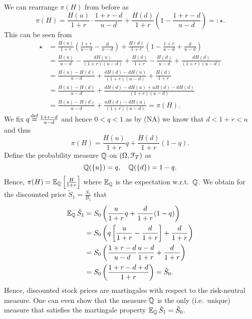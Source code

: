 \documentclass[12pt]{amsart}
\begin{document}
\begin{remark}
    We can rearrange \(\pi(H)\) from before as \[
        \pi(H) = \frac{H(u)}{1+r} \cdot \frac{1+r-d}{u-d} + \frac{H(d)}{1+r} \left(1-\frac{1+r-d}{u-d}\right) =: \star.
    \]
    This can be seen from \begin{align*}
        \star
        &= \frac{H(u)}{1+r}\left(\frac{1+r}{u-d}-\frac{d}{u-d}\right) + \frac{H(d)}{1+r}\left(1-\frac{1+r}{u-d}+\frac{d}{u-d}\right)\\
        &= \frac{H(u)}{u-d} - \frac{dH(u)}{(1+r)(u-d)} + \frac{H(d)}{1+r} - \frac{H(d)}{u-d} + \frac{d H(d)}{(1+r)(u-d)}\\
        &= \frac{H(u)-H(d)}{u-d} + \frac{dH(d)-dH(u)}{(1+r)(u-d)}+\frac{H(d)}{1+r}\\
        &= \frac{H(u)-H(d)}{u-d} + \frac{dH(d)-dH(u)+uH(d)-dH(d)}{(1+r)(u-d)}\\
        &= \frac{H(u)-H(d)}{u-d} + \frac{uH(d)-dH(u)}{(1+r)(u-d)} = \pi(H).
    \end{align*}
    We fix \(q \operatorname*{\stackrel{\operatorname{def}}{=}} \frac{1+r-d}{u-d}\) and hence \(0 < q < 1\) as by (NA) we know that \(d<1+r<u\) and thus \[
        \pi(H) = \frac{H(u)}{1+r}q+\frac{H(d)}{1+r}(1-q).
    \]
    Define the probability measure \(\mathbb{Q}\) on \((\Omega, \mathcal{F}_T)\) as \[
        \mathbb{Q}(\left\{ u \right\}) = q, \quad \mathbb{Q}(\left\{ d \right\})=1-q.
    \]
    Hence, \(\pi(H) = \operatorname{\mathbb{E}}_{\mathbb{Q}} \left[ \frac{H}{1+r} \right]\) where \(\operatorname{\mathbb{E}}_{\mathbb{Q}}\) is the expectation w.r.t.\ \(\mathbb{Q}\).
    We obtain for the discounted price \(\tilde{S}_1 = \frac{S_1}{B_1}\) that
    \begin{align*}
        \operatorname{\mathbb{E}}_{\mathbb{Q}} \tilde{S}_1
        &= S_0 \left( \frac{u}{1+r}q + \frac{d}{1+r}(1-q) \right)\\
        &= S_0 \left( q \left[ \frac{u}{1+r}-\frac{d}{1+r} \right] + \frac{d}{1+r} \right)\\
        &= S_0 \left( \frac{1+r-d}{u-d} \frac{u-d}{1+r} + \frac{d}{1+r} \right)\\
        &= S_0 \left( \frac{1+r-d+d}{1+r} \right) = \tilde{S}_0.
    \end{align*}
    Hence, discounted stock prices are martingales with respect to the risk-neutral measure. One can even show that the measure \(\mathbb{Q}\) is the only (i.e.\ unique) measure that satisfies the martingale property \(\operatorname{\mathbb{E}}_{\mathbb{Q}} \tilde{S}_1 = \tilde{S}_0\).
\end{remark}
\end{document}
